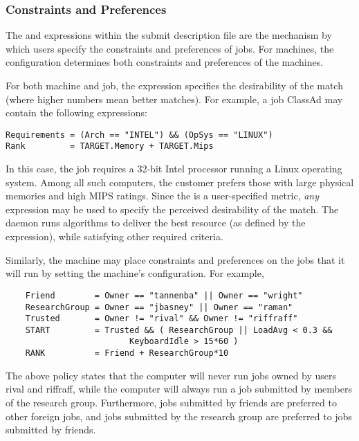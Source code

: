 \subsubsection{Constraints and Preferences}
The  and  expressions
within the submit description file
are the mechanism
by which users specify the constraints and preferences of jobs.
For machines, the configuration determines both 
constraints and preferences of the machines.

For both machine and job, 
the  expression specifies
the desirability of the match (where higher numbers mean better matches).
For example, a job ClassAd may contain the following expressions:
\footnotesize
\begin{verbatim}
Requirements = (Arch == "INTEL") && (OpSys == "LINUX")
Rank         = TARGET.Memory + TARGET.Mips
\end{verbatim}
\normalsize
In this case, the job requires a 32-bit Intel processor running a Linux
operating system.
Among all such computers,
the customer prefers those with large physical memories and high MIPS ratings.  
Since the  is a user-specified metric,
\emph{any} expression may be used to specify the
perceived desirability of the match.
The  daemon runs algorithms
to deliver the best resource (as defined by the  expression),
while satisfying other required criteria.

Similarly, the machine may place constraints and preferences on 
the jobs that it will run by setting the machine's configuration.
For example,
\footnotesize
\begin{verbatim}
    Friend        = Owner == "tannenba" || Owner == "wright"
    ResearchGroup = Owner == "jbasney" || Owner == "raman"
    Trusted       = Owner != "rival" && Owner != "riffraff"
    START         = Trusted && ( ResearchGroup || LoadAvg < 0.3 &&
                         KeyboardIdle > 15*60 )
    RANK          = Friend + ResearchGroup*10
\end{verbatim}
\normalsize

The above policy states that the computer will never run jobs owned by
users rival and riffraff, while the computer will always run a 
job submitted by members of the research group.
Furthermore,
jobs submitted by friends are preferred to other foreign jobs,
and jobs submitted
by the research group are preferred to jobs submitted by friends. 

